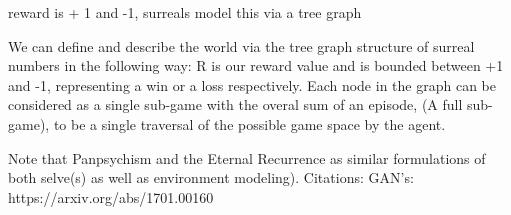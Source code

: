 \documentclass{article}
\begin{document}
reward is + 1 and -1, surreals model this via a tree graph

We can define and describe the world via the tree graph structure of surreal numbers in the following way: R is our reward value and is bounded between +1 and -1, representing a win or a loss respectively. Each node in the graph can be considered as a single sub-game with the overal sum of an episode, (A full sub-game), to be a single traversal of the possible game space by the agent. 



Note that Panpsychism and the Eternal Recurrence as similar formulations of both selve(s) as well as environment modeling).
Citations: 
GAN's: https://arxiv.org/abs/1701.00160
\end{document}
